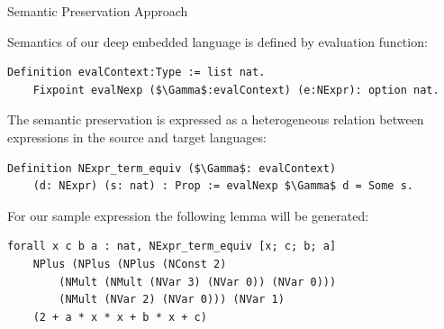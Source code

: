 \documentclass[aspectratio=169]{beamer}
\begin{document}
\begin{frame}[fragile]{Semantic Preservation Approach}
  
  Semantics of our deep embedded language is defined by evaluation
  function:

  \begin{lstlisting}[language=Coq, mathescape=true,frame=single]
    Definition evalContext:Type := list nat.
    Fixpoint evalNexp ($\Gamma$:evalContext) (e:NExpr): option nat.
  \end{lstlisting}

  The semantic preservation is expressed as a heterogeneous relation
  between expressions in the source and target languages:

  \begin{lstlisting}[language=Coq, mathescape=true,frame=single]
    Definition NExpr_term_equiv ($\Gamma$: evalContext)
    (d: NExpr) (s: nat) : Prop := evalNexp $\Gamma$ d = Some s.
  \end{lstlisting}

  For our sample expression the following lemma will be generated:
  
  \begin{lstlisting}[language=Coq, mathescape=true,frame=single]
forall x c b a : nat, NExpr_term_equiv [x; c; b; a]
    NPlus (NPlus (NPlus (NConst 2)
        (NMult (NMult (NVar 3) (NVar 0)) (NVar 0)))
        (NMult (NVar 2) (NVar 0))) (NVar 1)
    (2 + a * x * x + b * x + c)
  \end{lstlisting}
  
\end{frame}
\end{document}
